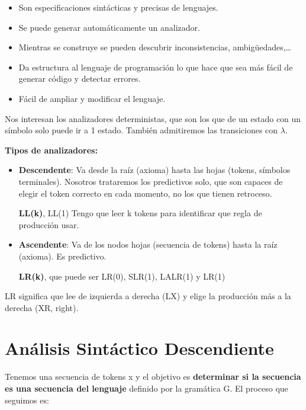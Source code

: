 \documentclass[12pt]{report} %
\begin{document}
\begin{itemize}

\item
  Son especificaciones sintácticas y precisas de lenguajes.
\item
  Se puede generar automáticamente un analizador.
\item
  Mientras se construye se pueden descubrir inconsistencias,
  ambigüedades,\ldots{}
\item
  Da estructura al lenguaje de programación lo que hace que sea más
  fácil de generar código y detectar errores.
\item
  Fácil de ampliar y modificar el lenguaje.
\end{itemize}

Nos interesan los analizadores deterministas, que son los que de un
estado con un símbolo solo puede ir a 1 estado. También admitiremos las
transiciones con \(\lambda\).

\textbf{Tipos de analizadores:}

\begin{itemize}
\item \textbf{Descendente}: Va desde la raíz (axioma) hasta las hojas
  (tokens, símbolos terminales). Nosotros trataremos los predictivos
  solo, que son capaces de elegir el token correcto en cada momento, no
  los que tienen retroceso.

  \textbf{LL(k)}, LL(1) Tengo que leer k tokens para identificar que
  regla de producción usar.
\item \textbf{Ascendente}: Va de los nodos hojas (secuencia de tokens) hasta
  la raíz (axioma). Es predictivo.

  \textbf{LR(k)}, que puede ser LR(0), SLR(1), LALR(1) y LR(1)
\end{itemize}

LR significa que lee de izquierda a derecha (LX) y elige la producción
más a la derecha (XR, right).

\section{Análisis Sintáctico Descendiente}

Tenemos una secuencia de tokens x y el objetivo es \textbf{determinar si
la secuencia es una secuencia del lenguaje} definido por la gramática G.
El proceso que seguimos es:
\end{document}
